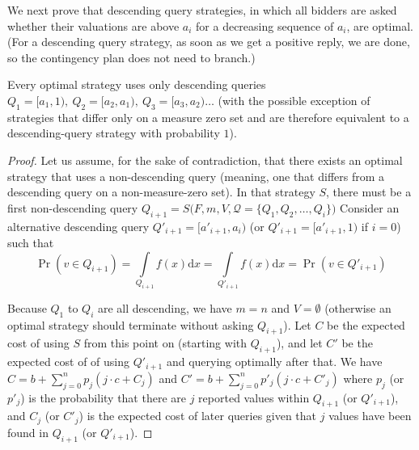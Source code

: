We next prove that descending query strategies, in which all bidders are
asked whether their valuations are above $a_i$ for a decreasing sequence of
$a_i$, are optimal.  (For a descending query strategy, as soon as we get a
positive reply, we are done, so the contingency plan does not need to branch.)

\begin{lemma}\label{lemma:descending}
Every optimal strategy 
uses only 
descending queries
$Q_1 = [a_1, 1), ~Q_2 = [a_2, a_1), ~Q_3 = [a_3, a_2)\ldots$
(with the possible exception of strategies that differ only on a measure
zero set
and are therefore equivalent to a descending-query strategy with
probability $1$).
\end{lemma}

\begin{proof}
Let us assume, for the sake of contradiction,
that there exists  an optimal strategy  that uses a 
non-descending query (meaning, one that differs from a descending query on
a non-measure-zero set).
In that strategy $S$, there must be a first non-descending query
$Q_{i+1} = S\big(F, m, V, \mathcal Q = \{Q_1, Q_2, \ldots, Q_i\}\big)$
Consider an alternative descending query
$Q'_{i+1} = [a'_{i+1}, a_i)$ (or $Q'_{i+1} = [a'_{i+1}, 1)$ if $i = 0$) such
that
\[
\Pr(v \in Q_{i+1}) = \int \limits_{Q_{i+1}} f(x) \mathrm d x = \int \limits_{Q'_{i+1}} f(x) \mathrm d x = \Pr(v \in Q'_{i+1})
\]

Because $Q_1$ to $Q_i$ are all descending, we have $m = n$ and $V = \emptyset$ (otherwise
an optimal strategy should terminate without asking $Q_{i+1}$).
Let $C$ be the expected cost of using $S$ from this point on
(starting with $Q_{i+1}$), and let $C'$ be the expected cost of 
of using $Q'_{i+1}$ and querying
optimally after that. We have\\
$
C = b + \sum_{j=0}^n p_j ( j \cdot c + C_j)
$
and
$
C' = b + \sum_{j=0}^n p'_j ( j \cdot c + C'_j)
$
where
$p_j$ (or $p'_j$) is the probability that there are $j$ reported values
within $Q_{i+1}$ (or $Q'_{i+1}$), and
$C_j$ (or $C'_j$) is the expected cost of later queries given that $j$ values have been
found in $Q_{i+1}$ (or $Q'_{i+1}$).


\end{proof}
